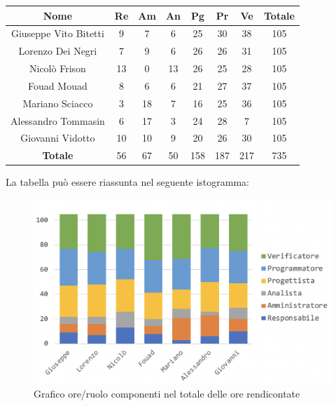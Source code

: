 				\begin{longtable}{|c|c|c|c|c|c|c|c}
					\hline
					\rowcolor{lighter-grayer}
					\textbf{Nome} & \textbf{Re} & \textbf{Am} & \textbf{An} & \textbf{Pg}  & \textbf{Pr}   & \textbf{Ve} & \textbf{Totale} \\
					\hline
					\endfirsthead
					
					\hline
					Giuseppe Vito Bitetti 		& 9 & 7 & 6 & 25 & 30 & 38 & 105\\
					\hline
					\hline
					Lorenzo Dei Negri			& 7 & 9 & 6 & 26 & 26 & 31 & 105\\
					\hline
					\hline
					Nicolò Frison				    & 13 & 0 & 13 &26 & 25 & 28 & 105\\
					\hline
					\hline
					Fouad Mouad 				 & 8 & 6 & 6 & 21 & 27 & 37 & 105\\
					\hline
					\hline
					Mariano Sciacco 			& 3 & 18 & 7 & 16 & 25 & 36 & 105\\
					\hline
					\hline
					Alessandro Tommasin    & 6 & 17 & 3 & 24 & 28 & 7 & 105\\
					\hline
					\hline
					Giovanni Vidotto 			 & 10 & 10 & 9 & 20 & 26 & 30 & 105\\
					\hline 
					\textbf{Totale}				 & 56 &  67 & 50 & 158 & 187 & 217 & 735\\
					\hline
				\end{longtable}
				\pagebreak
				
				La tabella può essere riassunta nel seguente istogramma:
				\begin{figure}[H]
					\centering
					\includegraphics[width=0.8\linewidth]{./images/totOreRed1.png}
					\caption{Grafico ore/ruolo componenti nel totale delle ore rendicontate}
					\label{fig:grafico suddivione ruoli totale ore rendicontete}
				\end{figure}
			
